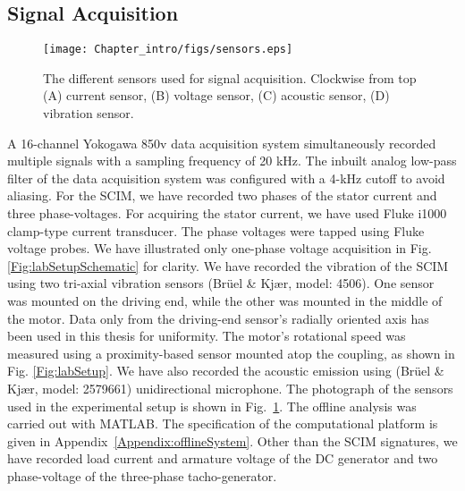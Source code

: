 \subsection{Signal Acquisition}
\begin{figure}[h] \centering
	{\texttt{[image: Chapter\_intro/figs/sensors.eps]}} 
	\caption{The different sensors used for signal acquisition. Clockwise from top (A) current sensor, (B) voltage sensor, (C) acoustic sensor, (D) vibration sensor.} \label{Fig:sensors}
\end{figure} 
A 16-channel Yokogawa 850v data acquisition system simultaneously recorded multiple signals with a sampling frequency of 20 kHz. The inbuilt analog low-pass filter of the data acquisition system was configured with a 4-kHz cutoff to avoid aliasing. For the SCIM, we have recorded two phases of the stator current and three phase-voltages. For acquiring the stator current, we have used Fluke i1000 clamp-type current transducer. The phase voltages were tapped using Fluke voltage probes. We have illustrated only one-phase voltage acquisition in Fig. \ref{Fig:labSetupSchematic} for clarity. We have recorded the vibration of the SCIM using two tri-axial vibration sensors (Brüel \& Kjær, model: 4506). One sensor was mounted on the driving end, while the other was mounted in the middle of the motor. Data only from the driving-end sensor’s radially oriented axis has been used in this thesis for uniformity. The motor's rotational speed was measured using a proximity-based sensor mounted atop the coupling, as shown in Fig. \ref{Fig:labSetup}. We have also recorded the acoustic emission using (Brüel \& Kjær, model: 2579661) unidirectional microphone. The photograph of the sensors used in the experimental setup is shown in Fig.~\ref{Fig:sensors}. The offline analysis was carried out with MATLAB. The specification of the computational platform is given in Appendix~\ref{Appendix:offlineSystem}. Other than the SCIM signatures, we have recorded load current and armature voltage of the DC generator and two phase-voltage of the three-phase tacho-generator. 

